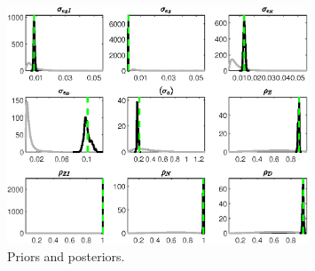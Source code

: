  
\begin{figure}[H]
\centering
\includegraphics[width=0.80\textwidth]{BRS_extended_fd/Output/BRS_extended_fd_PriorsAndPosteriors1}
\caption{Priors and posteriors.}\label{Fig:PriorsAndPosteriors:1}
\end{figure}
 

